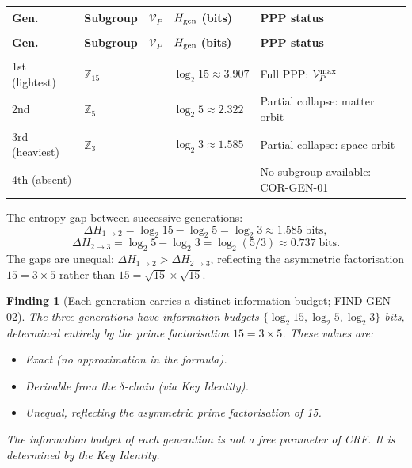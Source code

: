 \documentclass[12pt, a4paper]{article}
\newtheorem{finding}{Finding}[section]
\begin{document}
\begin{derivedbox}[title={Generation Entropy Table (EQ-GEN-03)}]
{\small
\renewcommand{\arraystretch}{1.30}
\begin{longtable}{>{\centering\arraybackslash}p{1.8cm}
                  >{\centering\arraybackslash}p{2.8cm}
                  >{\centering\arraybackslash}p{2.2cm}
                  >{\centering\arraybackslash}p{3.0cm}
                  >{\raggedright\arraybackslash}p{3.2cm}}
\toprule
\textbf{Gen.} & \textbf{Subgroup} & $\mathcal{V}_P$ &
$H_{\rm gen}$ \textbf{(bits)} & \textbf{PPP status} \\
\midrule
\endfirsthead
\multicolumn{5}{l}{\small\textit{(continued)}} \\[4pt]
\toprule
\textbf{Gen.} & \textbf{Subgroup} & $\mathcal{V}_P$ &
$H_{\rm gen}$ \textbf{(bits)} & \textbf{PPP status} \\
\midrule
\endhead
\midrule
\multicolumn{5}{r}{\small\textit{(continues)}} \\
\endfoot
\bottomrule
\endlastfoot
1st (lightest) & $\mathbb{Z}_{15}$ & 15 &
  $\log_2 15 \approx 3.907$ & Full PPP: $\mathcal{V}_P^{\rm max}$ \\
2nd & $\mathbb{Z}_5$ & 5 &
  $\log_2 5 \approx 2.322$ & Partial collapse: matter orbit \\
3rd (heaviest) & $\mathbb{Z}_3$ & 3 &
  $\log_2 3 \approx 1.585$ & Partial collapse: space orbit \\
\midrule
4th (absent) & --- & --- &
  --- & No subgroup available: COR-GEN-01 \\
\end{longtable}
}

The entropy gap between successive generations:
\[
  \Delta H_{1\to2} = \log_2 15 - \log_2 5 = \log_2 3 \approx 1.585
  \;\text{bits},
\]
\[
  \Delta H_{2\to3} = \log_2 5 - \log_2 3 = \log_2(5/3) \approx 0.737
  \;\text{bits.}
\]
The gaps are unequal: $\Delta H_{1\to2} > \Delta H_{2\to3}$,
reflecting the asymmetric factorisation $15 = 3 \times 5$
rather than $15 = \sqrt{15} \times \sqrt{15}$.
\end{derivedbox}

\begin{finding}[Each generation carries a distinct information
  budget; FIND-GEN-02]
\label{zc15:find:info-budget}
The three generations have information budgets $\{\log_2 15,
\log_2 5, \log_2 3\}$ bits, determined entirely by the prime
factorisation $15 = 3 \times 5$. These values are:
\begin{itemize}[noitemsep, leftmargin=*]
  \item Exact (no approximation in the formula).
  \item Derivable from the $\delta$-chain (via Key Identity).
  \item Unequal, reflecting the asymmetric prime factorisation
    of 15.
\end{itemize}
The information budget of each generation is \emph{not a free
parameter} of CRF. It is determined by the Key Identity.
\end{finding}
\end{document}
